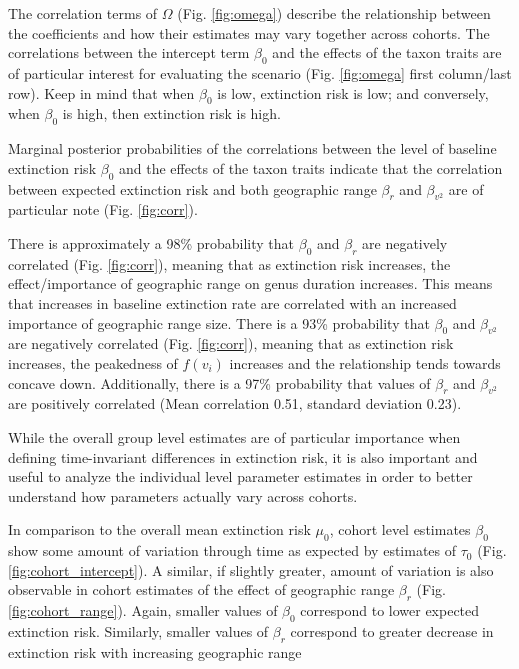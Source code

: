 \documentclass{article}
\begin{document}
The correlation terms of \(\Omega\) (Fig. \ref{fig:omega}) describe the relationship between the coefficients and how their estimates may vary together across cohorts. The correlations between the intercept term \(\beta_{0}\) and the effects of the taxon traits are of particular interest for evaluating the \citet{Jablonski1986} scenario (Fig. \ref{fig:omega} first column/last row). Keep in mind that when \(\beta_{0}\) is low, extinction risk is low; and conversely, when \(\beta_{0}\) is high, then extinction risk is high.

Marginal posterior probabilities of the correlations between the level of baseline extinction risk \(\beta_{0}\) and the effects of the taxon traits indicate that the correlation between expected extinction risk and both geographic range \(\beta_{r}\) and \(\beta_{v^{2}}\) are of particular note (Fig. \ref{fig:corr}). 

There is approximately a 98\% probability that \(\beta_{0}\) and \(\beta_{r}\) are negatively correlated (Fig. \ref{fig:corr}), meaning that as extinction risk increases, the effect/importance of geographic range on genus duration increases. This means that increases in baseline extinction rate are correlated with an increased importance of geographic range size. There is a 93\% probability that \(\beta_{0}\) and \(\beta_{v^{2}}\) are negatively correlated (Fig. \ref{fig:corr}), meaning that as extinction risk increases, the peakedness of \(f(v_{i})\) increases and the relationship tends towards concave down. Additionally, there is a 97\% probability that values of \(\beta_{r}\) and \(\beta_{v^{2}}\) are positively correlated (Mean correlation 0.51, standard deviation 0.23).

While the overall group level estimates are of particular importance when defining time-invariant differences in extinction risk, it is also important and useful to analyze the individual level parameter estimates in order to better understand how parameters actually vary across cohorts.

In comparison to the overall mean extinction risk \(\mu_{0}\), cohort level estimates \(\beta_{0}\) show some amount of variation through time as expected by estimates of \(\tau_{0}\) (Fig. \ref{fig:cohort_intercept}). A similar, if slightly greater, amount of variation is also observable in cohort estimates of the effect of geographic range \(\beta_{r}\) (Fig. \ref{fig:cohort_range}). Again, smaller values of \(\beta_{0}\) correspond to lower expected extinction risk. Similarly, smaller values of \(\beta_{r}\) correspond to greater decrease in extinction risk with increasing geographic range 
\end{document}
